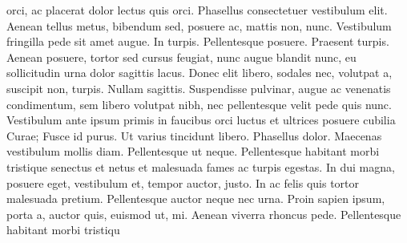 orci, ac placerat dolor lectus quis orci. Phasellus consectetuer vestibulum elit. Aenean tellus metus, bibendum sed, posuere ac, mattis non, nunc. Vestibulum fringilla pede sit amet augue. In turpis. Pellentesque posuere. Praesent turpis. Aenean posuere, tortor sed cursus feugiat, nunc augue blandit nunc, eu sollicitudin urna dolor sagittis lacus. Donec elit libero, sodales nec, volutpat a, suscipit non, turpis. Nullam sagittis. Suspendisse pulvinar, augue ac venenatis condimentum, sem libero volutpat nibh, nec pellentesque velit pede quis nunc. Vestibulum ante ipsum primis in faucibus orci luctus et ultrices posuere cubilia Curae; Fusce id purus. Ut varius tincidunt libero. Phasellus dolor. Maecenas vestibulum mollis diam. Pellentesque ut neque. Pellentesque habitant morbi tristique senectus et netus et malesuada fames ac turpis egestas. In dui magna, posuere eget, vestibulum et, tempor auctor, justo. In ac felis quis tortor malesuada pretium. Pellentesque auctor neque nec urna. Proin sapien ipsum, porta a, auctor quis, euismod ut, mi. Aenean viverra rhoncus pede. Pellentesque habitant morbi tristiqu

